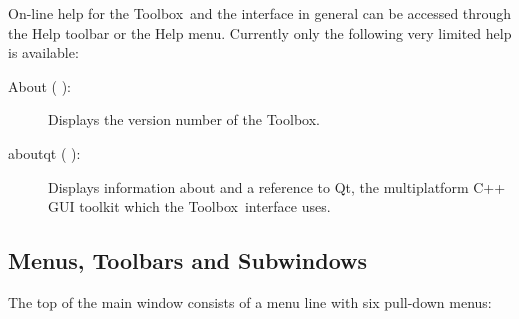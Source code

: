 \documentclass[\pformat,12pt]{article}
\newcommand{\Toolbox}{Toolbox}
\newcommand{\guicmd}[1]{{\sf #1}}
\begin{document}


On-line help for the \Toolbox\ and the interface in general can %
be accessed through the \guicmd{Help} toolbar or
the \guicmd{Help} menu. Currently only the following
very limited help is available:


\begin{description}
 \item[\guicmd{About} (\hspace{-1.8mm}
):]
  Displays the version number of the \Toolbox.
 \item[\guicmd{aboutqt}  (\hspace{-1.8mm}
):]
  Displays information about and a reference to Qt, the multiplatform
  C++ GUI toolkit which the \Toolbox\ interface uses.
\end{description}

\subsection{Menus, Toolbars and Subwindows}

The top of the main window consists of a menu line with six pull-down menus:
\end{document}
